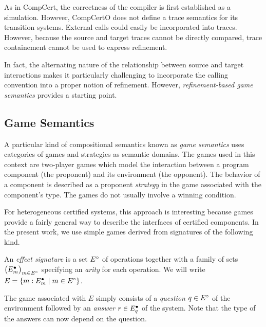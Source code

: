 \documentclass[acmsmall,review,anonymous]{acmart}\settopmatter{printfolios=true,printccs=false,printacmref=false}
\begin{document}
As in CompCert,
the correctness of the compiler is first established as a simulation.
However,
CompCertO does not define a trace semantics
for its transition systems.
External calls could easily be incorporated into traces.
However,
because the source and target traces cannot be directly compared,
trace containement cannot be used to express refinement.

In fact,
the alternating nature of the relationship between
source and target interactions
makes it particularly challenging to
incorporate the calling convention into
a proper notion of refinement.
However,
\emph{refinement-based game semantics} \cite{rbgs-cal}
provides a starting point.



\subsection{Game Semantics} %

A particular kind of compositional semantics
known as \emph{game semantics} uses
categories of games and strategies
as semantic domains.
The games used in this context are
two-player games
which model the interaction between
a program component (the proponent)
and its environment (the opponent).
The behavior of a component
is described as a proponent \emph{strategy}
in the game associated with the component's type.
The games do not usually involve
a winning condition. %

For heterogeneous certified systems,
this approach is interesting
because games provide a fairly general way to describe
the interfaces of certified components.
In the present work,
we use simple games
derived from signatures of the following kind.

\begin{definition}
An \emph{effect signature} is a set $E^\circ$ of operations
together with a family of sets $\big( E^\bullet_m \big)_{m \in E^\circ}$
specifying an \emph{arity} for each operation.
We will write
  $E = \{ m : E^\bullet_m \mid m \in E^\circ \}$.
\end{definition}

The game associated with $E$ simply consists of
a \emph{question} $q \in E^\circ$ of the environment
followed by an \emph{answer} $r \in E^\bullet_q$ of the system.
Note that the type of the answers can now depend on the question.
\end{document}
